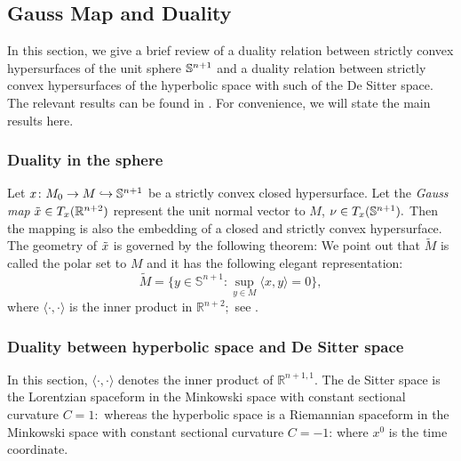 \subsection{Gauss Map and Duality}\label{Duality}
\label{gauss_duality}
In this section, we give a brief review of a duality relation between strictly convex hypersurfaces of the unit sphere $\S^{n+1}$ and a duality relation between strictly convex hypersurfaces of the hyperbolic space with such of the De Sitter space. The relevant results can be found in \cite[Ch.~9, 10]{Gerhardt:/2006}. For convenience, we will state the main results here.
\subsubsection*{Duality in the sphere}
Let $x\cn M_0\ra M\hra \S^{n+1}$ be a strictly convex closed hypersurface. Let the {\it{Gauss map}} $\~x\in T_x(\R^{n+2})$ represent the unit normal vector to $M$, $\nu\in T_x(\S^{n+1}).$ Then the mapping
is also the embedding of a closed and strictly convex hypersurface. The geometry of $\~x$ is governed by the following theorem:
We point out that $\tilde{M}$ is called the polar set to $M$ and it has the following elegant representation:
$$\tilde{M}=\{y\in \mathbb{S}^{n+1}: \sup_{y\in M}\langle x,y\rangle=0\},$$
where $\langle \cdot,\cdot\rangle$ is the inner product in $\mathbb{R}^{n+2};$ see \cite[Thm.~9.2.9]{Gerhardt:/2006}.
\subsubsection*{Duality between hyperbolic space and De Sitter space} In this section, $\langle \cdot,\cdot\rangle$ denotes the inner product of $\mathbb{R}^{n+1,1}.$
The de Sitter space is the Lorentzian spaceform in the Minkowski space with constant sectional curvature $C=1:$
whereas the hyperbolic space is a Riemannian spaceform in the Minkowski space with constant sectional curvature $C=-1$:
where $x^0$ is the time coordinate.

